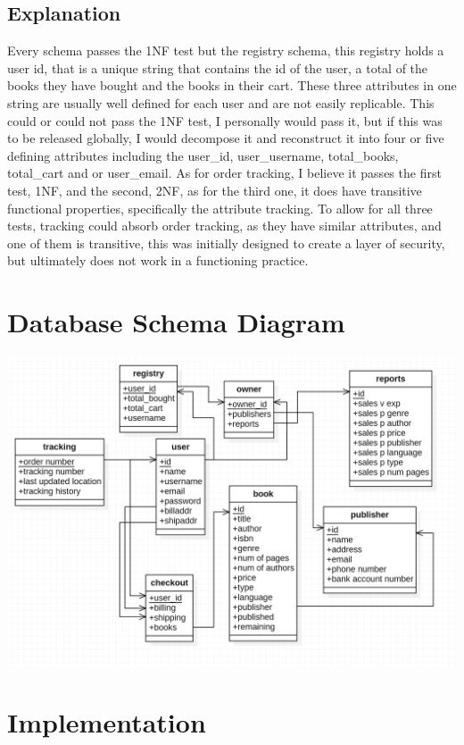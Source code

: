 \documentclass[a4 paper]{article}
\begin{document}
\subsection{Explanation}
\qquad Every schema passes the 1NF test but the registry schema, this registry holds a user id, that is a unique string that contains the id of the user, a total of the books they have bought and the books in their cart. These three attributes in one string are usually well defined for each user and are not easily replicable. This could or could not pass the 1NF test, I personally would pass it, but if this was to be released globally, I would decompose it and reconstruct it into four or five defining attributes including the user\_id, user\_username, total\_books, total\_cart and or user\_email. As for order tracking, I believe it passes the first test, 1NF, and the second, 2NF, as for the third one, it does have transitive functional properties, specifically the attribute tracking. To allow for all three tests, tracking could absorb order tracking, as they have similar attributes, and one of them is transitive, this was initially designed to create a layer of security, but ultimately does not work in a functioning practice. 
\section{Database Schema Diagram}
{\centering \includegraphics[width=\textwidth/1]{Schema_D.png}}
\section{Implementation}
\end{document}
